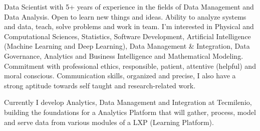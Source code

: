 %
%
%
\par{
Data Scientist with 5+ years of experience in the fields of Data Management and Data Analysis. Open to learn new things and ideas. Ability to analyze systems and data, teach, solve problems and work in team. I’m interested in Physical and Computational Sciences, Statistics, Software Development, Artificial Intelligence (Machine Learning and Deep Learning), Data Management  \& Integration, Data Governance, Analytics and Business Intelligence and Mathematical Modeling. Commitment with professional ethics, responsible, patient, attentive (helpful) and moral conscious. Communication skills, organized and precise, I also have a strong aptitude towards self taught and research-related work.

Currently I develop Analytics, Data Management and Integration at Tecmilenio, building the foundations for a Analytics Platform that will gather, process, model and serve data from various modules of a LXP (Learning Platform).
}